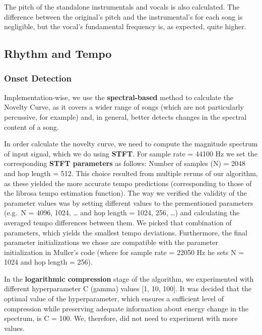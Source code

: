 \documentclass[
  letterpaper,
  twocolumn]{article}
\begin{document}
The pitch of the standalone instrumentals and vocals is also calculated.
The difference between the original's pitch and the instrumental's for
each song is negligible, but the vocal's fundamental frequency is, as
expected, quite higher.

\subsection{Rhythm and Tempo}\label{rhythm-and-tempo}

\subsubsection{Onset Detection}\label{onset-detection}

Implementation-wise, we use the \textbf{spectral-based} method to
calculate the Novelty Curve, as it covers a wider range of songs (which
are not particularly percussive, for example) and, in general, better
detects changes in the spectral content of a song.

In order calculate the novelty curve, we need to compute the magnitude
spectrum of input signal, which we do using \textbf{STFT}. For sample
rate = 44100 Hz we set the corresponding \textbf{STFT parameters} as
follows: Number of samples (N) = 2048 and hop length = 512. This choice
resulted from multiple reruns of our algorithm, as these yielded the
more accurate tempo predictions (corresponding to those of the librosa
tempo estimation function). The way we verified the validity of the
parameter values \hspace{0pt}\hspace{0pt}was by setting different values
\hspace{0pt}\hspace{0pt}to the prementioned parameters (e.g.~N = 4096,
1024, \ldots{} and hop length = 1024, 256, \ldots) and calculating the
averaged tempo differences between them. We picked that combination of
parameters, which yields the smallest tempo deviations. Furthermore, the
final parameter initializations we chose are compatible with the
parameter initialization in Muller's code (where for sample rate = 22050
Hz he sets N = 1024 and hop length = 256).

In the \textbf{logarithmic compression} stage of the algorithm, we
experimented with different hyperparameter C (gamma) values {[}1, 10,
100{]}. It was decided that the optimal value of the hyperparameter,
which ensures a sufficient level of compression while preserving
adequate information about energy change in the spectrum, is C = 100.
We, therefore, did not need to experiment with more values.
\end{document}
